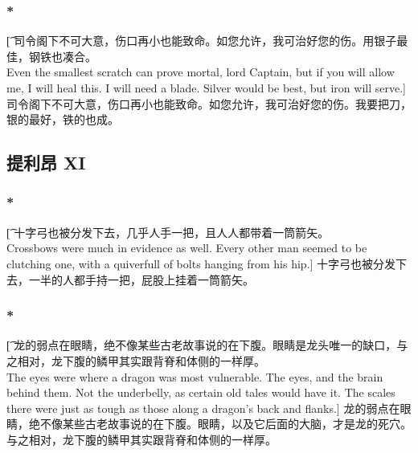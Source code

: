 \documentclass[12pt,a4paper]{article}
\begin{document}
\subsubsection{\color{red}*}\t[	
	司令阁下不可大意，伤口再小也能致命。如您允许，我可治好您的伤。用银子最佳，钢铁也凑合。\\
	Even the smallest scratch can prove mortal, lord Captain, but if you will allow me, I will heal this. I will need a blade. Silver would be best, but iron will serve.]
	司令阁下不可大意，伤口再小也能致命。如您允许，我可治好您的伤。我要把刀，银的最好，铁的也成。
	
\subsection{提利昂 XI}
\subsubsection{\color{red}*}\t[	
	十字弓也被分发下去，几乎人手一把，且人人都带着一筒箭矢。\\
	Crossbows were much in evidence as well. Every other man seemed to be clutching one, with a quiverfull of bolts hanging from his hip.]
	十字弓也被分发下去，一半的人都手持一把，屁股上挂着一筒箭矢。
	
\subsubsection{\color{red}*}\t[		
	龙的弱点在眼睛，绝不像某些古老故事说的在下腹。眼睛是龙头唯一的缺口，与之相对，龙下腹的鳞甲其实跟背脊和体侧的一样厚。\\
	The eyes were where a dragon was most vulnerable. The eyes, and the brain behind them. Not the underbelly, as certain old tales would have it. The scales there were just as tough as those along a dragon's back and flanks.]
	龙的弱点在眼睛，绝不像某些古老故事说的在下腹。眼睛，以及它后面的大脑，才是龙的死穴。与之相对，龙下腹的鳞甲其实跟背脊和体侧的一样厚。
\end{document}
